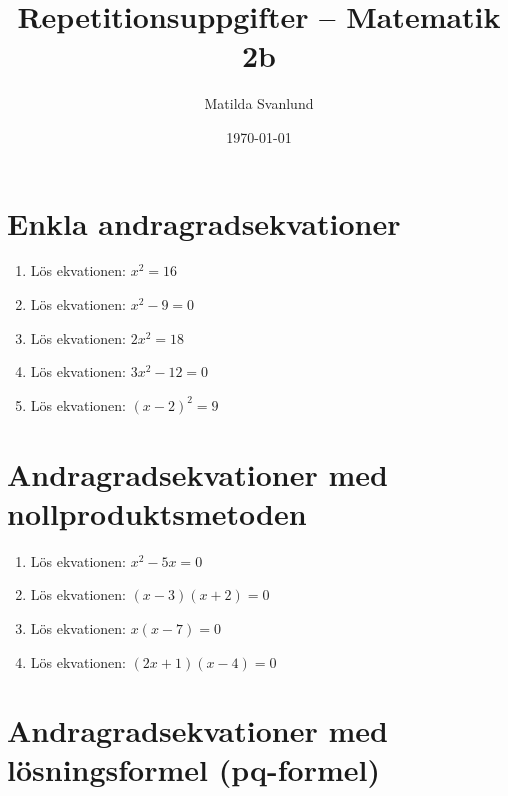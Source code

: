 \documentclass[a4paper,11pt]{article}
\title{Repetitionsuppgifter -- Matematik 2b}
\author{Matilda Svanlund}
\date{\today}
\begin{document}
\maketitle

\section{Enkla andragradsekvationer}

\begin{enumerate}[label=\textbf{\arabic*.}]
    \item Lös ekvationen: $x^2 = 16$
    
    \item Lös ekvationen: $x^2 - 9 = 0$
    
    \item Lös ekvationen: $2x^2 = 18$
    
    \item Lös ekvationen: $3x^2 - 12 = 0$
    
    \item Lös ekvationen: $(x - 2)^2 = 9$
\end{enumerate}

\section{Andragradsekvationer med nollproduktsmetoden}

\begin{enumerate}[label=\textbf{\arabic*.}]
    \item Lös ekvationen: $x^2 - 5x = 0$
    
    \item Lös ekvationen: $(x - 3)(x + 2) = 0$
    
    \item Lös ekvationen: $x(x - 7) = 0$
    
    \item Lös ekvationen: $(2x + 1)(x - 4) = 0$
\end{enumerate}

\section{Andragradsekvationer med lösningsformel (pq-formel)}
\end{document}
